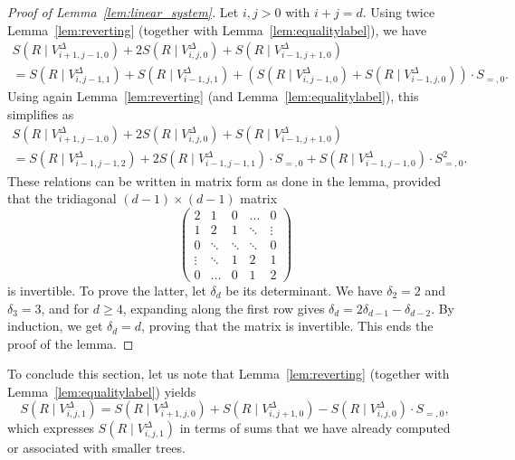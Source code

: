 \documentclass[12pt]{amsart}
\newcommand{\revision}[1]{{#1}}
\theoremstyle{plain}
\theoremstyle{remark}
\begin{document}
\begin{proof}[Proof of Lemma~\ref{lem:linear_system}]
  Let $i,j>0$ with $i+j=d$. Using twice Lemma~\ref{lem:reverting} (together with Lemma~\ref{lem:equalitylabel}),
  we have
  \begin{multline*} S(R \mid V^{\Delta}_{i+1,j-1,0})+ 2 S(R \mid V^{\Delta}_{i,j,0}) + S(R \mid V^{\Delta}_{i-1,j+1,0})  \\
  = S (R \mid V^{\Delta}_{i,j-1,1}) + S (R \mid V^{\Delta}_{i-1,j,1}) + (S (R \mid V^{\Delta}_{i,j-1,0}) + S (R \mid V^{\Delta}_{i-1,j,0}) )\cdot S_{=,0}.
\end{multline*}
Using again Lemma~\ref{lem:reverting} (and Lemma~\ref{lem:equalitylabel}), this simplifies as
 \begin{multline*} S(R \mid V^{\Delta}_{i+1,j-1,0})+ 2 S(R \mid V^{\Delta}_{i,j,0}) + S(R \mid V^{\Delta}_{i-1,j+1,0})  \\
   = S (R \mid V^{\Delta}_{i-1,j-1,2}) + 2 S (R \mid V^{\Delta}_{i-1,j-1,1}) \cdot S_{=,0} + S (R \mid V^{\Delta}_{i-1,j-1,0}) \cdot S_{=,0}^2.
 \end{multline*}
\revision{These relations can be written in matrix form as done in the lemma, provided that the tridiagonal $(d-1) \times (d-1)$ matrix
 \[ \begin{pmatrix}
    2 & 1 & 0 & \ldots &0 \\
    1 & 2 & 1 & \ddots & \vdots \\
    0 & \ddots  & \ddots & \ddots & 0 \\
    \vdots & \ddots & 1 & 2 & 1  \\
    0 & \ldots &0 & 1 & 2
  \end{pmatrix}\]
  is invertible. To prove the latter,
  let $\delta_{d}$ be its determinant. We have 
  $\delta_2=2$ and $\delta_3=3$, and 
  for $d \ge 4$, expanding along the first row gives $\delta_{d}=2 \delta_{d-1} - \delta_{d-2}$. By induction, we get $\delta_d=d$, proving that the matrix is invertible. This ends the proof of the lemma.}
  \end{proof}

To conclude this section, let us note that Lemma~\ref{lem:reverting} (together with Lemma~\ref{lem:equalitylabel}) yields
\begin{equation}
\label{eq:V4}
S (R \mid V^{\Delta}_{i,j,1})=  S(R \mid V^{\Delta}_{i+1,j,0}) + S(R \mid V^{\Delta}_{i,j+1,0}) -
S (R \mid V^{\Delta}_{i,j,0}) \cdot S_{=,0},
\end{equation}
which expresses $ S (R \mid V^{\Delta}_{i,j,1})$ in terms of sums that we have already computed or associated with smaller trees.
\end{document}
